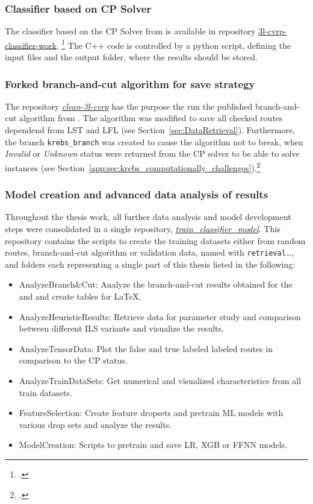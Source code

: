 \subsubsection{Classifier based on CP Solver}
The classifier based on the \gls{CP} Solver from \cite{tamke_repository_2024} is available in
repository \href{https://github.com/MxHbm/3l-cvrp-classifier-work}{3l-cvrp-classifier-work}. \footcite{tamke_repository_2024}
The C++ code is controlled by a python script, defining the input files and the output folder, where the results should be stored.

\subsubsection{Forked branch-and-cut algorithm for save strategy}
The  repository \href{https://github.com/MxHbm/clean-3l-cvrp}{\textit{clean-3l-cvrp}} has the purpose the run the published branch-and-cut algorithm from \cite{tamke_branch-and-cut_2024}. The algorithm
was modified to save all checked routes dependend from \gls{LST} and \gls{LFL} (see Section~\ref{sec:DataRetrieval}). Furthermore,
the branch \texttt{krebs\_branch} was created to cause the algorithm not to break, when \textit{Invalid} or \textit{Unknown}
status were returned from the \gls{CP} solver to be able to solve \krebsADataSetText instances (see Section~\ref{app:sec:krebs_computationally_challenges}).\footcite[cf.][]{tamke_branch-and-cut_2024}

\subsubsection{Model creation and advanced data analysis of results}

Throughout the thesis work, all further data analysis and model development steps were consolidated in a single repository,
\href{https://github.com/MxHbm/train_classifier_model}{\textit{train\_classifier\_model}}. This repository contains the scripts to
create the training datasets either from random routes, branch-and-cut algorithm or validation data, named with \texttt{retrieval}\dots,
and folders each representing a single part of this thesis listed in the following:
\begin{itemize}
	\item AnalyzeBranch\&Cut: Analyze the branch-and-cut results obtained for the \gendreauDataSetText and \krebsADataSetText and create tables for \LaTeX.
	\item AnalyzeHeuristicResults: Retrieve data for parameter study and comparison between different \gls{ILS} variants and visualize the results.
	\item AnalyzeTensorData: Plot the false and true labeled labeled routes in comparison to the \gls{CP} status.
	\item AnalyzeTrainDataSets: Get numerical and visualized characteristics from all train datasets.
	\item FeatureSelection: Create feature dropsets and pretrain \gls{ML} models with various drop sets and analyze the results.
	\item ModelCreation: Scripts to pretrain and save \gls{LR}, \gls{XGB} or \gls{FFNN} models.
\end{itemize}

